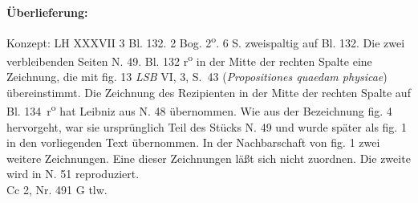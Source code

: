       
               
                \begin{ledgroupsized}[r]{120mm}
                \footnotesize 
                \pstart                
                \noindent\textbf{\"{U}berlieferung:}   
                \pend
                \end{ledgroupsized}
            
              
                            \begin{ledgroupsized}[r]{114mm}
                            \footnotesize 
                            \pstart \parindent -6mm
                            Konzept: LH XXXVII 3 Bl. 132. 2 Bog. 2\textsuperscript{o}. 6 S. zweispaltig auf Bl. 132. Die zwei verbleibenden Seiten N. 49\raisebox{-0.5ex}{\notsotiny 2}. Bl. 132 r\textsuperscript{o} in der Mitte der rechten Spalte eine Zeichnung, die mit fig. 13 \cite{00258}\textit{LSB} VI, 3, S.~43 (\cite{00257}\textit{Propositiones quaedam physicae}) \"{u}bereinstimmt. Die Zeichnung des Rezipienten in der Mitte der rechten Spalte auf Bl. 134~r\textsuperscript{o} hat Leibniz aus \cite{00267}N. 48 \"{u}bernommen. Wie aus der Bezeichnung fig. 4 hervorgeht, war sie urspr\"{u}nglich Teil des St\"{u}cks N. 49\raisebox{-0.5ex}{\notsotiny 2} und wurde sp\"{a}ter als fig. 1 in den vorliegenden Text \"{u}bernommen. In der Nachbarschaft von fig. 1 zwei weitere Zeichnungen. Eine dieser Zeichnungen l\"{a}ßt sich nicht zuordnen. Die zweite wird in N. 51 reproduziert.\\Cc 2, Nr. 491 G tlw. \pend
                            \end{ledgroupsized}
                \vspace*{8mm}
                              \pstart 
                \normalsize
